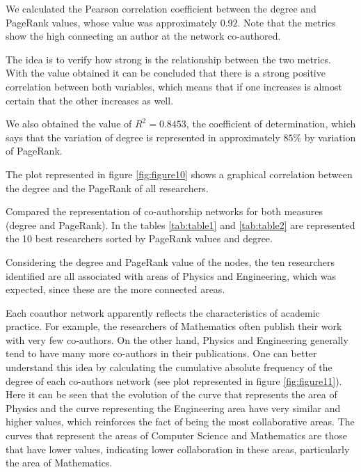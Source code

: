 \documentclass{article}
\begin{document}
\begin{multicols}{2}

We calculated the Pearson correlation coefficient between the degree and PageRank values, whose value was approximately $0.92$. Note that the metrics show the high connecting an author at the network co-authored.


The idea is to verify how strong is the relationship between the two metrics. With the value obtained it can be concluded that there is a strong positive correlation between both variables, which means that if one increases is almost certain that the other increases as well.

We also obtained the value of $R^2= 0.8453$, the coefficient of determination, which says that the variation of degree is represented in approximately $85\%$ by variation of PageRank.

The plot represented in figure \ref{fig:figure10} shows a graphical correlation between the degree and the PageRank of all researchers.


Compared the representation of co-authorship networks for both measures (degree and PageRank). In the tables \ref{tab:table1} and \ref{tab:table2} are represented the 10 best researchers sorted by PageRank values and degree.

Considering the degree and PageRank value of the nodes, the ten researchers identified are all associated with areas of Physics and Engineering, which was expected, since these are the more connected areas.

Each coauthor network apparently reflects the characteristics of academic practice. For example, the researchers of Mathematics often publish their work with very few co-authors. On the other hand, Physics and Engineering generally tend to have many more co-authors in their publications. One can better understand this idea by calculating the cumulative absolute frequency of the degree of each co-authors network (see plot represented in figure \ref{fig:figure11}). Here it can be seen that the evolution of the curve that represents the area of Physics and the curve representing the Engineering area have very similar and higher values, which reinforces the fact of being the most collaborative areas. The curves that represent the areas of Computer Science and Mathematics are those that have lower values, indicating lower collaboration in these areas, particularly the area of Mathematics.


\end{multicols}
\end{document}
